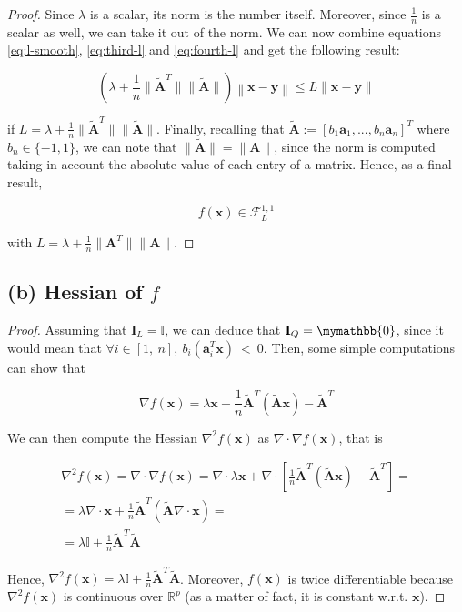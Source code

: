 \documentclass[12pt]{article}
\newcommand{\xb}{\mathbf{x}}
\newcommand{\yb}{\mathbf{y}}
\newcommand{\ab}{\mathbf{a}}
\newcommand{\abi}{\ab_i}
\newcommand{\atilde}{\mathbf{\tilde{A}}}
\newcommand{\id}{\mathbf{I}}
\newcommand{\fracn}{\frac{1}{n}}
\begin{document}
\begin{proof}
Since $\lambda$ is a scalar, its norm is the number itself. Moreover, since $\fracn$ is a scalar as well, we can take it out of the norm. We can now combine equations \eqref{eq:l-smooth}, \eqref{eq:third-l} and \eqref{eq:fourth-l} and get the following result:

\begin{equation}
    \left ( \lambda + \fracn \lVert \atilde^T \rVert \lVert \atilde \rVert \right ) \left \lVert \xb - \yb \right \rVert \leq L \lVert \xb - \yb \rVert
\end{equation}

if $L = \lambda + \fracn \lVert \atilde^T \rVert \lVert \atilde \rVert$. Finally, recalling that $\atilde:=[b_1\ab_1, ..., b_n\ab_n]^T$ where $b_n \in \{-1, 1\}$, we can note that $\lVert \atilde \rVert = \lVert \mathbf{A} \rVert$, since the norm is computed taking in account the absolute value of each entry of a matrix. Hence, as a final result,

\begin{equation}
    f(\xb) \in \mathcal{F}_{L}^{1, 1}
\end{equation}

with $L = \lambda + \fracn \lVert \mathbf{A}^T \rVert \lVert \mathbf{A} \rVert$.


\end{proof}

\subsection*{(b) Hessian of $f$}
\begin{proof}
Assuming that $\id_L = \mathbb{I}$, we can deduce that $\id_Q = \mymathbb{0}$, since it would mean that $\forall i \in [1,\ n], \ b_i(\abi^T\xb) \ < \ 0$. Then, some simple computations can show that

\begin{equation}
    \nabla f(\xb) = \lambda \xb + \fracn \atilde^T(\atilde\xb) - \atilde^T
\end{equation}

We can then compute the Hessian $\nabla^2 f(\xb)$ as $\nabla \cdot \nabla f(\xb)$, that is

\begin{gather}
    \nabla^2 f(\xb) = \nabla \cdot \nabla f(\xb) = \nabla \cdot \lambda \xb + \nabla \cdot \left [ \fracn \atilde^T(\atilde\xb) - \atilde^T \right ] \nonumber = \\
    = \lambda \nabla \cdot \xb + \fracn \atilde^T (\atilde \nabla \cdot \xb) = \nonumber \\
    = \lambda \mathbb{I} + \fracn \atilde^T \atilde
\end{gather}

Hence, $\nabla^2 f(\xb) = \lambda \mathbb{I} + \fracn \atilde^T \atilde$. Moreover, $f(\xb)$ is twice differentiable because $\nabla ^2 f(\xb)$ is continuous over $\mathbb{R}^p$ (as a matter of fact, it is constant w.r.t. $\xb$).

\end{proof}
\end{document}
